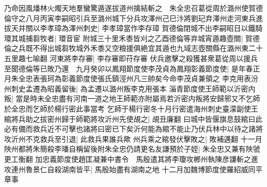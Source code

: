 乃命因風燔林火燭天地羣蠻驚遁遂拔道州擒結斬之　朱全忠召葛從周於潞州使賀德倫守之八月丙寅李嗣昭引兵至潞州城下分兵攻澤州己巳汴將劉玘弃澤州走河東兵進拔天并關以李孝璋為澤州刺史|{
	李孝璋當作李存璋}
賀德倫閉城不出李嗣昭日以鐵騎環其城捕芻牧者|{
	環音宦}
附城三十里禾黍皆刈之乙酉德倫等弃城宵遁趣壺關|{
	賀德倫之兵既不得出城芻牧城外禾黍又空粮援俱絶宜其遁也九域志壺關縣在潞州東二十五里趣七喻翻}
河東將李存審|{
	李存審即苻存審}
伏兵邀擊之殺獲甚衆葛從周以援兵至聞德倫等已敗乃還　九月癸卯以鳳翔節度使李茂貞為鳳翔彰義節度使|{
	是年春正月朱全忠表張珂為彰義節度使張氏鎮涇州凡三帥矣今命李茂貞兼領之}
李克用表汾州刺史孟遷為昭義留後|{
	為孟遷以潞州叛李克用張本}
淄青節度使王師範以沂密内叛|{
	當是時未全忠盡有河南一道之地王師範亦附屬焉若沂密内叛將安歸邪又不乞師於全忠而乞師於楊行密此事當考}
乞師于楊行密冬十月行密遣海州刺史臺濛副使王綰將兵助之拔密州歸于師範將攻沂州先使覘之|{
	覘丑廉翻}
曰城中皆偃旗息鼓綰曰此必有備而救兵近不可擊也諸將曰密已下矣沂何能為綰不能止乃伏兵林中以待之諸將攻沂州不克救兵至引退|{
	此救兵果誰兵歟}
州兵乘之綰發伏擊敗之|{
	敗補邁翻}
十一月陜州都將朱簡殺李璠自稱留後附朱全忠仍請更名友謙預於子姪|{
	朱全忠又兼有陜虢更工衡翻}
加忠義節度使趙匡凝兼中書令　馬殷遣其將李瓊攻郴州執陳彦謙斬之進攻連州魯景仁自殺湖南皆平|{
	馬殷始盡有湖南之地}
十二月加魏博節度使羅紹威同平章事

